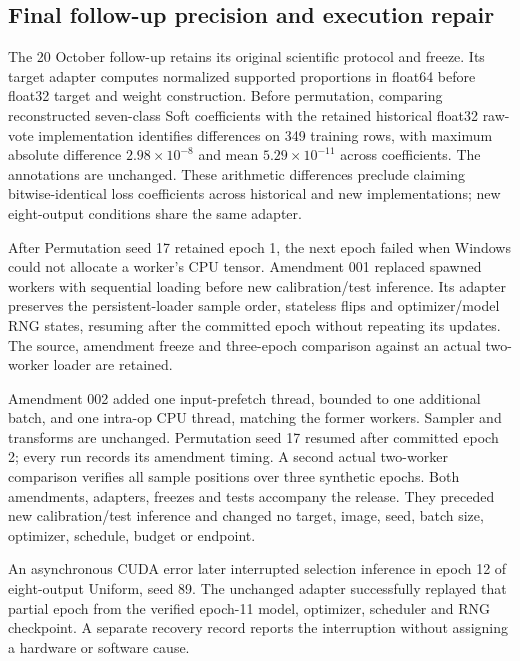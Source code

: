 \subsection*{Final follow-up precision and execution repair}
The 20 October follow-up retains its original scientific protocol and freeze. Its target adapter computes normalized supported proportions in float64 before float32 target and weight construction. Before permutation, comparing reconstructed seven-class Soft coefficients with the retained historical float32 raw-vote implementation identifies differences on 349 training rows, with maximum absolute difference $2.98\times10^{-8}$ and mean $5.29\times10^{-11}$ across coefficients. The annotations are unchanged. These arithmetic differences preclude claiming bitwise-identical loss coefficients across historical and new implementations; new eight-output conditions share the same adapter.

After Permutation seed 17 retained epoch 1, the next epoch failed when Windows could not allocate a worker's CPU tensor. Amendment 001 replaced spawned workers with sequential loading before new calibration/test inference. Its adapter preserves the persistent-loader sample order, stateless flips and optimizer/model RNG states, resuming after the committed epoch without repeating its updates. The source, amendment freeze and three-epoch comparison against an actual two-worker loader are retained.

Amendment 002 added one input-prefetch thread, bounded to one additional batch, and one intra-op CPU thread, matching the former workers. Sampler and transforms are unchanged. Permutation seed 17 resumed after committed epoch 2; every run records its amendment timing. A second actual two-worker comparison verifies all sample positions over three synthetic epochs. Both amendments, adapters, freezes and tests accompany the release. They preceded new calibration/test inference and changed no target, image, seed, batch size, optimizer, schedule, budget or endpoint.

An asynchronous CUDA error later interrupted selection inference in epoch 12 of eight-output Uniform, seed 89. The unchanged adapter successfully replayed that partial epoch from the verified epoch-11 model, optimizer, scheduler and RNG checkpoint. A separate recovery record reports the interruption without assigning a hardware or software cause.
